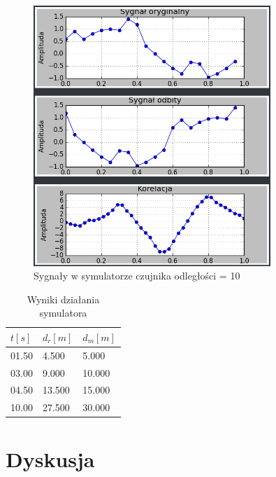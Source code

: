 \documentclass{article}
\begin{document}
{{\begin{figure}[h!]
            \end{figure}
            \begin{figure}[h!]
                \centering
                \includegraphics[width=0.8\textwidth]{img/sim20.png}
                \caption{Sygnały w symulatorze czujnika odległości = 10}
            \end{figure}
            \FloatBarrier
            \begin{table}[h!]
                \centering
                \begin{tabular}{|l|l|l|}
                    \hline
                    $t[s]$ & $d_r[m]$ & $d_m[m]$ \\ \hline
                    01.50  & 4.500    & 5.000    \\ \hline
                    03.00  & 9.000    & 10.000    \\ \hline
                    04.50  & 13.500   & 15.000    \\ \hline
                    10.00  & 27.500   & 30.000    \\ \hline
                \end{tabular}
                \caption{Wyniki działania symulatora}
            \end{table}
        }
        \newpage
    }
\section{Dyskusja}
\end{document}
